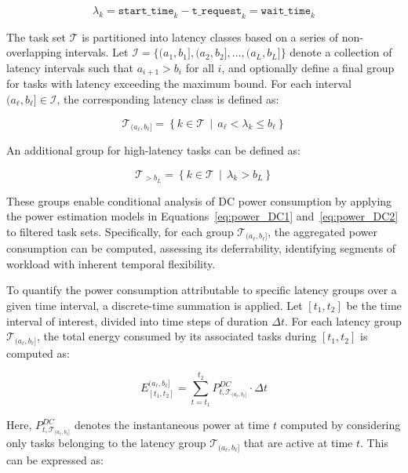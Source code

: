 \documentclass[preprint,12pt]{elsarticle}
\begin{document}
\begin{equation}
\lambda_k = \texttt{start\_time}_k - \texttt{t\_request}_k = \texttt{wait\_time}_k
\end{equation}

The task set $\mathcal{T}$ is partitioned into latency classes based on a series of non-overlapping intervals. Let $\mathcal{I} = \{ (a_1, b_1], (a_2, b_2], \dots, (a_L, b_L] \}$ denote a collection of latency intervals such that $a_{i+1} > b_i$ for all $i$, and optionally define a final group for tasks with latency exceeding the maximum bound. For each interval $(a_\ell, b_\ell] \in \mathcal{I}$, the corresponding latency class is defined as:

\begin{equation}
\mathcal{T}_{(a_\ell, b_\ell]} = \left\{ k \in \mathcal{T} \,\middle|\, a_\ell < \lambda_k \leq b_\ell \right\}
\end{equation}

An additional group for high-latency tasks can be defined as:

\begin{equation}
\mathcal{T}_{>b_L} = \left\{ k \in \mathcal{T} \,\middle|\, \lambda_k > b_L \right\}
\end{equation}

These groups enable conditional analysis of DC power consumption by applying the power estimation models in Equations~\ref{eq:power_DC1} and~\ref{eq:power_DC2} to filtered task sets. Specifically, for each group $\mathcal{T}_{(a_\ell, b_\ell]}$, the aggregated power consumption can be computed, assessing its deferrability, identifying segments of workload with inherent temporal flexibility.

To quantify the power consumption attributable to specific latency groups over a given time interval, a discrete-time summation is applied. Let $[t_1, t_2]$ be the time interval of interest, divided into time steps of duration $\Delta t$. For each latency group $\mathcal{T}_{(a_\ell, b_\ell]}$, the total energy consumed by its associated tasks during $[t_1, t_2]$ is computed as:

\begin{equation}
E^{(a_\ell, b_\ell]}_{[t_1, t_2]} = \sum_{t = t_1}^{t_2} P^{DC}_{t, \mathcal{T}_{(a_\ell, b_\ell]}} \cdot \Delta t
\label{eq:energy_group}
\end{equation}

Here, $P^{DC}_{t, \mathcal{T}_{(a_\ell, b_\ell]}}$ denotes the instantaneous power at time $t$ computed by considering only tasks belonging to the latency group $\mathcal{T}_{(a_\ell, b_\ell]}$ that are active at time $t$. This can be expressed as:
\end{document}

